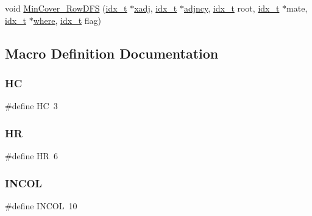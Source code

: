 \begin{DoxyCompactItemize}
\item 
void \hyperlink{a00245_a807020dce58bb03a180aa4a0cb8cdd3e}{Min\+Cover\+\_\+\+Row\+D\+FS} (\hyperlink{a00876_aaa5262be3e700770163401acb0150f52}{idx\+\_\+t} $\ast$\hyperlink{a00879_aa8fc7f75458e38e1e2979ed6db639164}{xadj}, \hyperlink{a00876_aaa5262be3e700770163401acb0150f52}{idx\+\_\+t} $\ast$\hyperlink{a00879_a20c068e3ebdd8f9889fb82c1f677d679}{adjncy}, \hyperlink{a00876_aaa5262be3e700770163401acb0150f52}{idx\+\_\+t} root, \hyperlink{a00876_aaa5262be3e700770163401acb0150f52}{idx\+\_\+t} $\ast$mate, \hyperlink{a00876_aaa5262be3e700770163401acb0150f52}{idx\+\_\+t} $\ast$\hyperlink{a00879_a7a355801f721e9d8d4ae03590a3a56b0}{where}, \hyperlink{a00876_aaa5262be3e700770163401acb0150f52}{idx\+\_\+t} flag)
\end{DoxyCompactItemize}


\subsection{Macro Definition Documentation}
\mbox{\label{a00245_a29939a749d943e3eba661f4f0302ef72}} 
\subsubsection{\texorpdfstring{HC}{HC}}
{\footnotesize\ttfamily \#define HC~3}

\mbox{\label{a00245_a9f4fe887f0a8d76a310f6539ebbae763}} 
\subsubsection{\texorpdfstring{HR}{HR}}
{\footnotesize\ttfamily \#define HR~6}

\mbox{\label{a00245_ae32d01fd4cd18c869890a19c37b1258c}} 
\subsubsection{\texorpdfstring{I\+N\+C\+OL}{INCOL}}
{\footnotesize\ttfamily \#define I\+N\+C\+OL~10}

\mbox{\label{a00245_a035a2028a6ea146356743a6d3a94703c}} 
